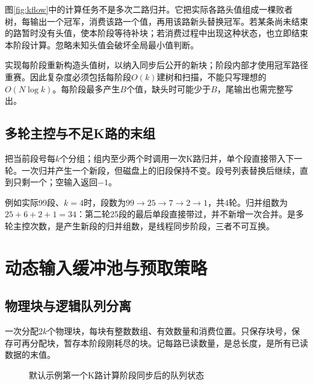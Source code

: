 图\ref{fig:kflow}中的计算任务不是多次二路归并。它把实际各路头值组成一棵败者树，每输出一个冠军，消费该路一个值，再用该路新头替换冠军。若某条尚未结束的路暂时没有头值，使本阶段等待补块；若消费过程中出现这种状态，也立即结束本阶段计算。忽略未知头值会破坏全局最小值判断。

实现每阶段重新构造头值树，以纳入同步后公开的新块；阶段内部才使用冠军路径重赛。因此复杂度必须包括每阶段$O(k)$建树和扫描，不能只写理想的$O(N\log k)$。每阶段最多产生$B$个值，缺头时可能少于$B$，尾输出也需完整写出。

\subsection{多轮主控与不足K路的末组}
把当前段号每$k$个分组；组内至少两个时调用一次K路归并，单个段直接带入下一轮。一次归并产生一个新段，但磁盘上的旧段保持不变。段号列表替换后继续，直到只剩一个；空输入返回$-1$。

例如实际99段、$k=4$时，段数为$99\to25\to7\to2\to1$，共4轮。归并组数为$25+6+2+1=34$：第二轮25段的最后单段直接带过，并不新增一次合并。是多轮主控次数，是产生新段的归并组数，是线程同步阶段，三者不可互换。

\section{动态输入缓冲池与预取策略}
\subsection{物理块与逻辑队列分离}
一次分配$2k$个物理块，每块有整数数组、有效数量和消费位置。只保存块号，保存可再分配块，暂存本阶段刚耗尽的块。记每路已读数量，是总长度，是所有已读数据的末值。

\begin{figure}[htbp]\centering
{}\caption{默认示例第一个K路计算阶段同步后的队列状态}\label{fig:pool}\end{figure}

